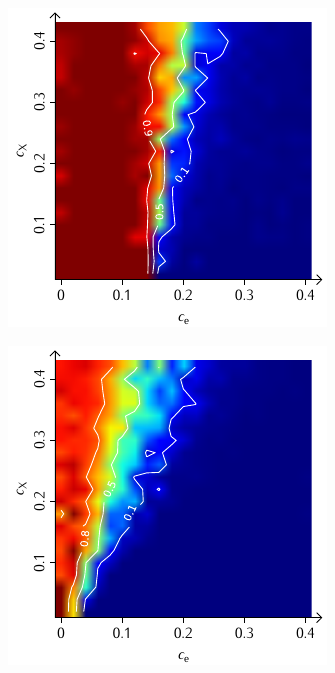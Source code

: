 \documentclass[a4paper, 10pt, twoside, openany]{book} %
\begin{document}
\begin{figure}
    \begin{minipage}[t]{0.48\textwidth}
        \includegraphics[width=\textwidth]{Abbildungen/Phasendiagramme/Konturen/H_cluster_G.pdf}
        \label{H_cluster_G}
    \end{minipage}
    \hfill
    \begin{minipage}[t]{0.48\textwidth}
        \includegraphics[width=\textwidth]{Abbildungen/Phasendiagramme/Konturen/H_penalty_cluster_G.pdf}

\end{minipage}
\end{figure}
\end{document}
